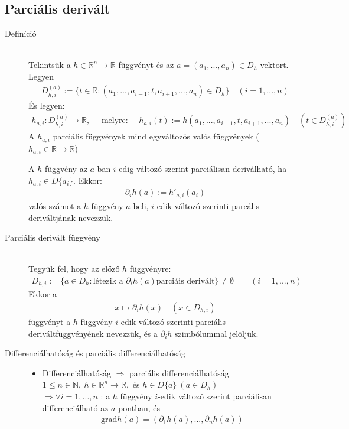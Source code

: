 \documentclass[margin=0px]{article}
\newcommand{\R}{\mathbb{R}}
\begin{document}
		\subsection{Parciális derivált}
			\begin{description}
				\item[Definíció] \hfill \\
					Tekintsük a $ h \in \R^n \rightarrow \R $ függvényt és az $a = (a_1, ... , a_n) \in D_h $ vektort. Legyen
					\begin{align*}
						D_{h,i}^{(a)} := \{t \in \R : (a_1, ..., a_{i-1}, t, a_{i+1}, ..., a_n) \in D_h\} \quad (i = 1,...,n)
					\end{align*}
					És legyen:
					\begin{align*}
						h_{a,i} : D_{h,i}^{(a)} \rightarrow \R, \quad \textrm{ melyre: } \quad h_{a,i}(t) := h(a_1, ..., a_{i-1}, t, a_{i+1}, ..., a_n) \quad (t\in	D_{h,i}^{(a)} )
					\end{align*}
					A $h_{a,i}$ parciális függvények mind egyváltozós valós függvények ($h_{a,i} \in \R \rightarrow\R $)
					
					A $ h $ függvény az $a$-ban $i$-edig változó szerint parciálisan deriválható, ha $ h_{a,i} \in D\{a_i\} $. Ekkor: 
					\begin{align*}
						\partial_ih(a) := h'_{a,i}(a_i)
					\end{align*}
					valós számot a $h$ függvény $a$-beli, $i$-edik változó szerinti parcális deriváltjának nevezzük.
				\item[Parciális derivált függvény] \hfill \\
					Tegyük fel, hogy az előző $h$ függvényre:
					\begin{align*}
						D_{h,i} := \{a \in D_h : \textrm{létezik a } \partial_ih(a) \textrm{parciáis derivált}\} \neq \emptyset \qquad (i=1,...,n)
					\end{align*}
					Ekkor a 
					\begin{align*}
						 x \mapsto \partial_ih(x) \quad (x\in D_{h,i})
					\end{align*}
					függvényt a $h$ függvény $i$-edik változó szerinti parciális deriváltfüggvényének nevezzük, és a $\partial_ih$ szimbólummal jelöljük.
				\item[Differenciálhatóság és parciális differenciálhatóság] \hfill 
					\begin{itemize}
						\item Differenciálhatóság $\Rightarrow$ parciális differenciálhatóság \\
							$ 1 \leq n \in \mathbb{N}, \ h \in \R^n \rightarrow \R, $ és $h\in D\{a\} \ (a \in D_h) $ \\
							$\Rightarrow \forall i = 1,...,n$ : a $h$ függvény $i$-edik változó szerint parciálisan differenciálható az $a$ pontban, és
							\begin{align*}
								\textrm{grad}h(a) = (\partial_1h(a), ..., \partial_nh(a))
							\end{align*}
							

\end{itemize}
\end{description}
\end{document}
